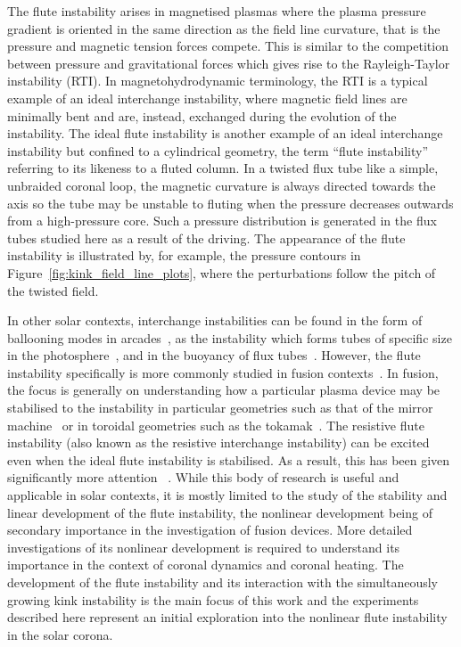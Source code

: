 \documentclass[fleqn,usenatbib]{mnras}
\newcommand{\revcite}[1]{{\color{red} \underline{#1}}}
\begin{document}
The flute instability arises in magnetised plasmas where the plasma pressure
gradient is oriented in the same direction as the field line curvature, that is
the pressure and magnetic tension forces compete. This is similar to the
competition between pressure and gravitational forces which gives rise to the
Rayleigh-Taylor instability (RTI). In magnetohydrodynamic terminology, the RTI
is a typical example of an ideal interchange instability, where magnetic field
lines are minimally bent and are, instead, exchanged during the evolution of
the instability. The ideal flute instability is another example of an ideal
interchange instability but confined to a cylindrical geometry, the term
``flute instability'' referring to its likeness to a fluted column. In
a twisted flux tube like a simple, unbraided coronal loop, the magnetic
curvature is always directed towards the axis so the tube may be unstable to
fluting when the pressure decreases outwards from a high-pressure core. Such
a pressure distribution is generated in the flux tubes studied here as a result
of the driving. The appearance of the flute instability is illustrated by, for
example, the pressure contours in Figure~\ref{fig:kink_field_line_plots}, where
the perturbations follow the pitch of the twisted field. 

In other solar contexts, interchange instabilities can be found in the form of
ballooning modes in arcades~\citep{hoodBallooningInstabilitiesSolar1986}, as
the instability which forms tubes of specific size in the
photosphere~\citep{bunteInterchangeInstabilitySolar1993}, and in the buoyancy of
flux tubes~\citep{schuesslerInterchangeInstabilitySmall1984}. However, the
flute instability specifically is more commonly studied in fusion
contexts~\citep{mikhailovskiiInstabilitiesConfinedPlasma1998,zhengAdvancedTokamakStability2015,wessonHydromagneticStabilityTokamaks1978}.
In fusion, the focus is generally on understanding how a particular plasma
device may be stabilised to the instability in particular geometries such as
that of the mirror machine~\citep{jungwirthTheoryFluteInstability1965} or in
toroidal geometries such as the
tokamak~\citep{shafranovFluteInstabilityCurrentcarrying1968}. The resistive
flute instability (also known as the resistive interchange instability) can be
excited even when the ideal flute instability is stabilised. As a result, this
has been given significantly more
attention~\revcite{\citep{johnsonResistiveInterchangesNegativeV1967,correa-restrepoResistiveBallooningModes1983}}.
While this body of research is useful and applicable in solar contexts, it is
mostly limited to the study of the stability and linear development of the
flute instability, the nonlinear development being of secondary importance in
the investigation of fusion devices. More detailed investigations of its
nonlinear development is required to understand its importance in the context
of coronal dynamics and coronal heating. The development of the flute
instability and its interaction with the simultaneously growing kink
instability is the main focus of this work and the experiments described here
represent an initial exploration into the nonlinear flute instability in the
solar corona.
\end{document}
